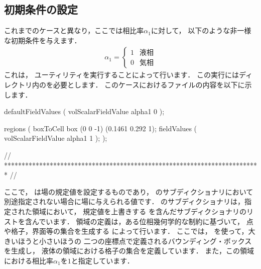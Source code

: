 \subsection{初期条件の設定}
\label{ssec:2.3.3}
これまでのケースと異なり，ここでは相比率$\alpha_{1}$に対して，
以下のような非一様な初期条件を与えます．
\begin{align}
 \label{eq:2.15}
 \alpha_{1} =
 \begin{cases}
  1 & \text{液相} \\
  0 & \text{気相}
 \end{cases}
\end{align}
これは，
%
%
ユーティリティを実行することによって行います．
この実行にはディレクトリ内のを必要とします．
このケースにおけるファイルの内容を以下に示します．
\begin{OFverbatim}[file, linenum=17]

defaultFieldValues
(
    volScalarFieldValue alpha1 0
);

regions
(
    boxToCell
    {
        box (0 0 -1) (0.1461 0.292 1);
        fieldValues
        (
            volScalarFieldValue alpha1 1
        );
    }
);


// ************************************************************************* //
\end{OFverbatim}
ここで，
%
%
は場の規定値を設定するものであり，
%
%
のサブディクショナリにおいて別途指定されない場合に場に与えられる値です．
のサブディクショナリは，指定された領域において，
規定値を上書きする
%
%
を含んだサブディクショナリのリストを含んでいます．
領域の定義は，ある位相幾何学的な制約に基づいて，
点や格子，界面等の集合を生成する
%
%
によって行います．
ここでは，
%
%
を使って，大きいほうと小さいほうの
二つの座標点で定義されるバウンディング・ボックスを生成し，
液体の領域における格子の集合を定義しています．
また，この領域における相比率$\alpha_{1}$を$1$と指定しています．

